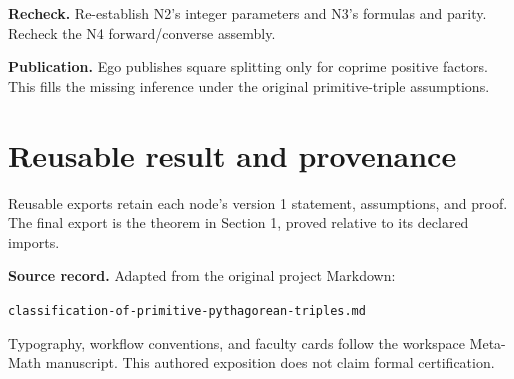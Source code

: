\documentclass[preprint,12pt,aps,pra,showkeys,amsmath,amssymb,superscriptaddress,floatfix]{revtex4-2}
\theoremstyle{definition}
\theoremstyle{remark}
\newcommand{\field}[2]{\par\smallskip\noindent\textbf{#1.} #2\par}
\begin{document}
\field{Recheck}{Re-establish N2's integer parameters and N3's formulas and parity.
Recheck the N4 forward/converse assembly.}

\field{Publication}{Ego publishes square splitting only for coprime positive factors. This
fills the missing inference under the original primitive-triple
assumptions.}

\section{Reusable result and provenance}
Reusable exports retain each node's version 1 statement, assumptions, and proof.
The final export is the theorem in Section 1, proved relative to its declared imports.

\smallskip\noindent\textbf{Source record.} Adapted from the original project Markdown:
\par\noindent\nolinkurl{classification-of-primitive-pythagorean-triples.md}\par
Typography, workflow conventions, and faculty cards follow the workspace Meta-Math
manuscript. This authored exposition does not claim formal certification.
\end{document}
